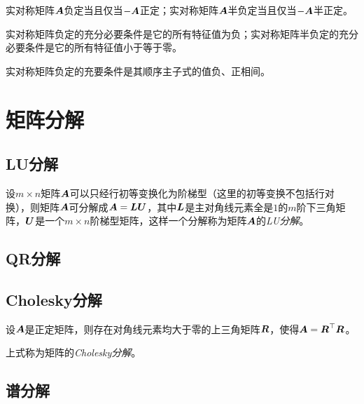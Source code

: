 \documentclass{ctexart}
\begin{document}
\begin{theorem}
    实对称矩阵\(\boldsymbol{A}\)负定当且仅当\(-\boldsymbol{A}\)正定；实对称矩阵\(\boldsymbol{A}\)半负定当且仅当\(-\boldsymbol{A}\)半正定。
\end{theorem}

\begin{theorem}
    实对称矩阵负定的充分必要条件是它的所有特征值为负；实对称矩阵半负定的充分必要条件是它的所有特征值小于等于零。
\end{theorem}

\begin{theorem}
    实对称矩阵负定的充要条件是其顺序主子式的值负、正相间。
\end{theorem}

\section{矩阵分解}

\subsection{LU分解}

\begin{theorem}
    设\(m\times n\)矩阵\(\boldsymbol{A}\)可以只经行初等变换化为阶梯型（这里的初等变换不包括行对换），则矩阵\(\boldsymbol{A}\)可分解成\(\boldsymbol{A}=\boldsymbol{L}\boldsymbol{U}\)，其中\(\boldsymbol{L}\)是主对角线元素全是\(1\)的\(m\)阶下三角矩阵，\(\boldsymbol{U}\)是一个\(m\times n\)阶梯型矩阵，这样一个分解称为矩阵\(\boldsymbol{A}\)的\emph{LU分解}。
\end{theorem}

\subsection{QR分解}

\subsection{Cholesky分解}

\begin{theorem}[Cholesky分解]
    设\(\boldsymbol{A}\)是正定矩阵，则存在对角线元素均大于零的上三角矩阵\(\boldsymbol{R}\)，使得\(\boldsymbol{A}=\boldsymbol{R}^\top\boldsymbol{R}\)。

    上式称为矩阵的\emph{Cholesky分解}。
\end{theorem}

\subsection{谱分解}
\end{document}
